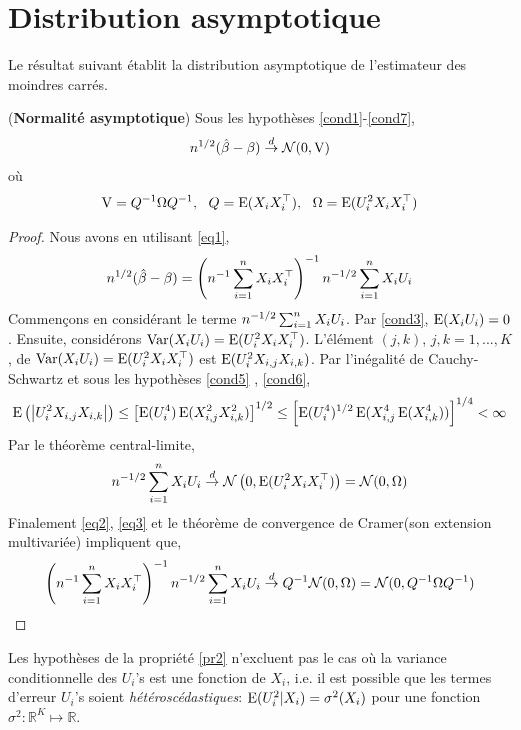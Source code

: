 \section{Distribution asymptotique}
Le résultat suivant établit la distribution asymptotique de l'estimateur des moindres carrés.
\begin{propriete}\label{pr2}(\textbf{Normalité asymptotique})
Sous les hypothèses \ref{cond1}-\ref{cond7},
\begin{align*}
n^{1/2}(\hat{\beta}- \beta) \overset{d}{\rightarrow} \mathcal{N}(0, \operatorname{V})
\end{align*}
où
\begin{align*}
\operatorname{V} = Q^{-1} \Omega Q^{-1}, \ \ Q = \operatorname{E}(X_iX_i^\top), \ \ \Omega =  \operatorname{E}(U_i^2X_iX_i^\top)
\end{align*}
\end{propriete}
\begin{proof}
Nous avons en utilisant \eqref{eq1},
\begin{align*}
n^{1/2}(\hat{\beta}- \beta) = \left(n^{-1}\sum_{i=1}^n X_iX_i^\top\right)^{-1}n^{-1/2}\sum_{i=1}^n X_iU_i 
\end{align*}
Commençons en considérant le terme $n^{-1/2}\sum_{i=1}^n X_iU_i$. Par \ref{cond3}, $\operatorname{E}(X_iU_i) = 0$. Ensuite, considérons 
$\operatorname{Var}(X_iU_i) = \operatorname{E}(U_i^2X_iX_i^\top)$.    
L'élément  $(j, k)$, $j,k = 1,...,K$, de $\operatorname{Var}(X_iU_i) = \operatorname{E}(U_i^2X_iX_i^\top)$ est $\operatorname{E}(U_i^2X_{i,j}X_{i,k})$.  
Par l'inégalité de Cauchy-Schwartz et sous les hypothèses \ref{cond5} , \ref{cond6},
\begin{align*}
\operatorname{E}\left(\left\vert {U_i^2 X_{i,j}  X_{i,k}} \right\vert\right) \leq \left[\operatorname{E}(U_i^4)\operatorname{E}(X_{i,j}^2X_{i,k}^2)\right]^{1/2} \leq  \left[\operatorname{E}(U_i^4)^{1/2}
\operatorname{E}(X_ {i,j}^4\operatorname{E}(X_{i,k}^4))\right]^{1/4} < \infty 
\end{align*}
Par le théorème central-limite,
\begin{align}
n^{-1/2}\sum_{i=1}^n X_iU_i  \overset{d}{\rightarrow} \mathcal{N}\left(0, \operatorname{E}(U_i^2X_iX_i^\top)\right) = \mathcal{N}(0, \Omega)
\label{eq3}
\end{align}
Finalement \eqref{eq2}, \eqref{eq3} et le théorème de convergence de Cramer(son extension multivariée) impliquent que,
\begin{align*}
\left(n^{-1}\sum_{i=1}^n X_iX_i^\top\right)^{-1}n^{-1/2}\sum_{i=1}^n X_iU_i \overset{d}{\rightarrow} Q^{-1} \mathcal{N}(0, \Omega) = \mathcal{N}(0, Q^{-1}\Omega Q^{-1})
\end{align*}
\end{proof}
\begin{remarque}\label{re1}
Les hypothèses de la propriété \ref{pr2} n'excluent pas le cas où la variance conditionnelle des $U_i$'s est une fonction de $X_i$, i.e. il est possible que les termes d'erreur $U_i$'s soient \emph{hétéroscédastiques}: $\operatorname{E}(U_i^2|X_i) = \sigma^2(X_i)$ pour une fonction $\sigma^2: \mathbb{R}^K \mapsto \mathbb{R}$.
\end{remarque}
